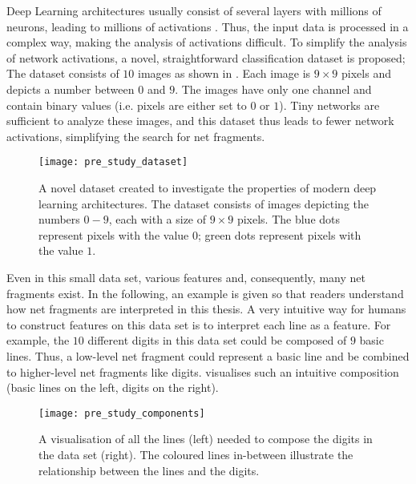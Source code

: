 Deep Learning architectures usually consist of several layers with millions of neurons, leading to millions of activations \cite{Szegedy_Liu_Jia_Sermanet_Reed_Anguelov_Erhan_Vanhoucke_Rabinovich_2014, He_Zhang_Ren_Sun_2016, Ronneberger_Fischer_Brox_2015, He_Gkioxari_Dollar_Girshick_2017, Liu_Anguelov_Erhan_Szegedy_Reed_Fu_Berg_2016, Redmon_Divvala_Girshick_Farhadi_2016}.
Thus, the input data is processed in a complex way, making the analysis of activations difficult.
To simplify the analysis of network activations, a novel, straightforward classification dataset is proposed;
The dataset consists of $10$ images as shown in .
Each image is $9\times9$ pixels and depicts a number between $0$ and $9$.
The images have only one channel and contain binary values (i.e. pixels are either set to $0$ or $1$).
Tiny networks are sufficient to analyze these images, and this dataset thus leads to fewer network activations, simplifying the search for net fragments.

\begin{figure}[h]
    \centering
    \texttt{[image: pre\_study\_dataset]}
    \caption[Straight line digits dataset]{A novel dataset created to investigate the properties of modern deep learning architectures. The dataset consists of images depicting the numbers $0-9$, each with a size of $9\times9$ pixels. The blue dots represent pixels with the value $0$; green dots represent pixels with the value $1$.}
\end{figure}

Even in this small data set, various features and, consequently, many net fragments exist.
In the following, an example is given so that readers understand how net fragments are interpreted in this thesis.
A very intuitive way for humans to construct features on this data set is to interpret each line as a feature.
For example, the $10$ different digits in this data set could be composed of $9$ basic lines.
Thus, a low-level net fragment could represent a basic line and be combined to higher-level net fragments like digits.
 visualises such an intuitive composition (basic lines on the left, digits on the right).

\begin{figure}[h]
    \centering
    \texttt{[image: pre\_study\_components]}
    \caption[Line Types in Straight Line Digits Dataset]{A visualisation of all the lines (left) needed to compose the digits in the data set (right). The coloured lines in-between illustrate the relationship between the lines and the digits.}
\end{figure}

